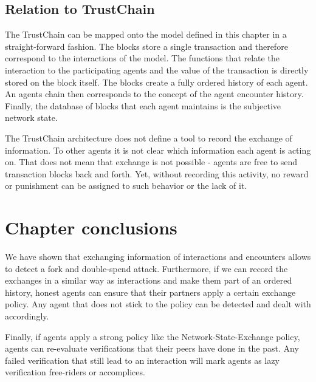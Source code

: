 \subsection{Relation to TrustChain}
The TrustChain can be mapped onto the model defined in this chapter in a straight-forward 
fashion. The blocks store a single transaction and therefore correspond to the interactions of the
model. The functions that relate the interaction to the participating agents and the value of the 
transaction is directly stored on the block itself. The blocks create a fully ordered history of 
each agent. An agents chain then corresponds to the concept of the agent encounter history. Finally, 
the database of blocks that each agent maintains is the subjective network state.

The TrustChain architecture does not define a tool to record the exchange of information. To other 
agents it is not clear which information each agent is acting on. That does not mean that exchange 
is not possible - agents are free to send transaction blocks back and forth. Yet, without recording
this activity, no reward or punishment can be assigned to such behavior or the lack of it. 

\section{Chapter conclusions}
We have shown that exchanging information of interactions and encounters allows to detect a 
fork and double-spend attack. Furthermore, if we can record the exchanges in a similar way as
interactions and make them part of an ordered history, honest agents can ensure that their partners
apply a certain exchange policy. Any agent that does not stick to the policy can be detected and 
dealt with accordingly. 

Finally, if agents apply a strong policy like the Network-State-Exchange policy, agents can
re-evaluate verifications that their peers have done in the past. Any failed verification that still
lead to an interaction will mark agents as lazy verification free-riders or accomplices.